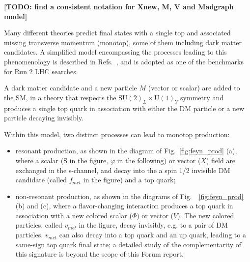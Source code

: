 \textbf{[TODO: find a consistent notation for Xnew, M, V and Madgraph model]}

\newcommand{\SUtwoUone}{\ensuremath{\mathrm{SU}(2)_{L} \times \mathrm{U}(1)_{Y}}\xspace}
\newcommand{\SUtwo}{\ensuremath{\mathrm{SU}(2)_{L}}\xspace}
\newcommand{\Lagr}{\ensuremath{\mathcal{L}}\xspace}
\newcommand{\fmet}{\ensuremath{f_{\mathrm{met}}}\xspace}
\newcommand{\met}{MET\xspace}
\newcommand{\ares}{\ensuremath{a_{\mathrm{res}}}\xspace}
\newcommand{\anonres}{\ensuremath{a_{\mathrm{non-res}}}\xspace}
\newcommand{\Xnew}{\ensuremath{X_{\mathrm{new}}}\xspace}
\newcommand{\BR}[2]{\ensuremath{\mathrm{BR}({#1} \to {#2})}\xspace}
\newcommand{\ssll}{\ensuremath{\ell^{+}\ell^{+}}\xspace}
\newcommand{\ttbarV}{\ensuremath{\ttbar V}\xspace}
\def\mfmet{\ensuremath{m(f_{\mathrm{met}})}}
\def\mvmet{\ensuremath{m(v_{\mathrm{met}})}}
\def\vmet{\ensuremath{v_{\mathrm{met}}}}
\def\fmet{\ensuremath{f_{\mathrm{met}}}}


Many different theories predict final states with a single top and associated missing 
transverse momentum (monotop), some of them including dark matter candidates. 
A simplified model encompassing the processes leading to this phenomenology is described in Refs.~\cite{AndreaFuksMaltoni,Agram:2013wda,Boucheneb:2014wza},
and is adopted as one of the benchmarks for Run 2 LHC searches. 

A dark matter candidate \DMParticle and a new particle $M$ (vector or scalar) 
are added to the SM, in a theory that respects the $\SUtwoUone$ symmetry 
and produces a single top quark in association with either the DM particle or a new particle
decaying invisibly. 

Within this model, two distinct processes can lead to monotop production:
\begin{itemize}
	\item resonant production, as shown in the diagram of Fig.~\ref{fig:feyn_prod} (a), where a scalar (S in the figure, $\varphi$ in the following) or vector ($X$) field are exchanged in the s-channel, and decay into the a spin 1/2 invisible DM candidate (called $f_{met}$ in the figure) and a top quark;
	\item non-resonant production, as shown in the diagrams of Fig.~~\ref{fig:feyn_prod} (b) and (c), where a flavor-changing interaction produces a top quark in association with a new colored scalar ($\Phi$) or vector ($V$). The new colored particles, called $v_{met}$ in the figure, decay invisibly, e.g. to a pair of DM particles. $v_{met}$ can also decay into a top quark and an up quark, leading to a same-sign top quark final state; a detailed study of the complementarity of this signature is beyond the scope of this Forum report.  
\end{itemize}

